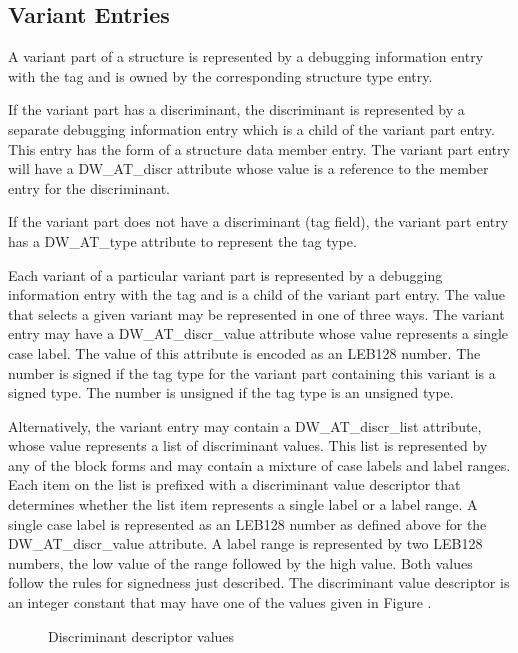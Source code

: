 \subsection{Variant Entries}
\label{chap:variantentries}

A variant part of a structure is represented by a debugging
information entry with the 
tag  and is
owned by the corresponding structure type entry.

If the variant part has a discriminant, the discriminant is
represented by a separate debugging information entry which
is a child of the variant part entry. This entry has the form
of a structure data member entry. The variant part entry will
have a DW\_AT\_discr attribute whose value is a reference to
the member entry for the discriminant.

If the variant part does not have a discriminant (tag field),
the variant part entry has a DW\_AT\_type attribute to represent
the tag type.

Each variant of a particular variant part is represented by
a debugging information entry with the 
tag 
and is a child of the variant part entry. The value that
selects a given variant may be represented in one of three
ways. The variant entry may have a DW\_AT\_discr\_value attribute
whose value represents a single case label. The value of this
attribute is encoded as an LEB128 number. The number is signed
if the tag type for the variant part containing this variant
is a signed type. The number is unsigned if the tag type is
an unsigned type.

Alternatively, the variant entry may contain a DW\_AT\_discr\_list
attribute, whose value represents a list of discriminant
values. This list is represented by any of the block forms and
may contain a mixture of case labels and label ranges. Each
item on the list is prefixed with a discriminant value
descriptor that determines whether the list item represents
a single label or a label range. A single case label is
represented as an LEB128 number as defined above for the
DW\_AT\_discr\_value attribute. A label range is represented by
two LEB128 numbers, the low value of the range followed by the
high value. Both values follow the rules for signedness just
described. The discriminant value descriptor is an integer
constant that may have one of the values given in 
Figure .

\begin{figure}[here]
\caption{Discriminant descriptor values}\label{fig:discriminantdescriptorvalues}
\end{figure}


